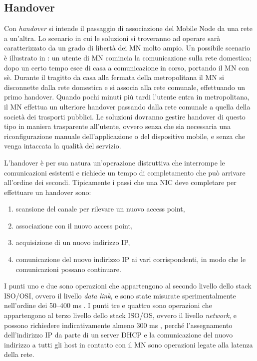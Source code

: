 \documentclass[12pt,a4paper,openright,twoside]{book}
\begin{document}
\subsection{Handover}
\label{sec:handover}
Con \emph{handover} si intende il passaggio di associazione del Mobile
Node da una rete a un'altra. Lo scenario in cui le soluzioni si
troveranno ad operare sarà caratterizzato da un grado di libertà dei
MN molto ampio. Un possibile scenario è illustrato in \cite{bib:abc}:
un utente di MN comincia la comunicazione sulla rete domestica; dopo
un certo tempo esce di casa a comunicazione in corso, portando il MN
con sè. Durante il tragitto da casa alla fermata della metropolitana
il MN si disconnette dalla rete domestica e si associa alla rete
comunale, effettuando un primo handover. Quando pochi minuti più tardi
l'utente entra in metropolitana, il MN effettua un ulteriore handover
passando dalla rete comunale a quella della società dei trasporti
pubblici. Le soluzioni dovranno gestire handover di questo tipo in
maniera trasparente all'utente, ovvero senza che sia necessaria una
riconfigurazione manuale dell'applicazione o del dispositivo mobile, e
senza che venga intaccata la qualità del servizio.

L'handover è per sua natura un'operazione distruttiva che interrompe
le comunicazioni esistenti e richiede un tempo di completamento che
può arrivare all'ordine dei secondi. Tipicamente i passi che una NIC
deve completare per effettuare un handover sono:
\begin{enumerate}
\item scansione del canale per rilevare un nuovo access point,
\item associazione con il nuovo access point,
\item acquisizione di un nuovo indirizzo IP,
\item comunicazione del nuovo indirizzo IP ai vari corrispondenti, in
  modo che le comunicazioni possano continuare.
\end{enumerate}
I punti uno e due sono operazioni che appartengono al secondo livello
dello stack ISO/OSI, ovvero il livello \emph{data link}, e sono state
misurate sperimentalmente nell'ordine dei 50--400 ms
\cite{bib:misura-handoff-l2}. I punti tre e quattro sono operazioni
che appartengono al terzo livello dello stack ISO/OS, ovvero il
livello \emph{network}, e possono richiedere indicativamente almeno
300 ms \cite{bib:misura-handoff-dhcp}, perché l'assegnamento
dell'indirizzo IP da parte di un server DHCP e la comunicazione del
nuovo indirizzo a tutti gli host in contatto con il MN sono operazioni
legate alla latenza della rete.
\end{document}
